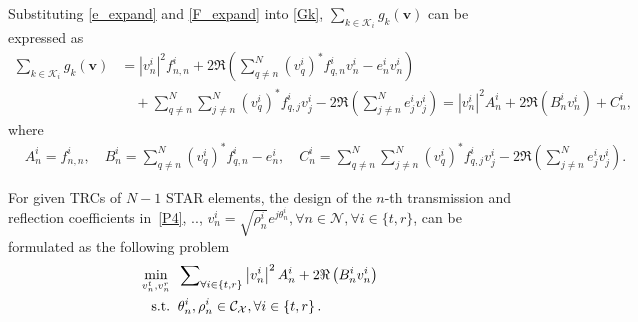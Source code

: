 \documentclass[12pt, draftclsnofoot, onecolumn]{IEEEtran}
\newcommand{\ie}{\text{i}.\text{e}.}
\begin{document}
Substituting \eqref{e_expand} and \eqref{F_expand} into \eqref{Gk}, $\sum_{k\in\mathcal{K}_i}g_k\left(\mathbf{v}\right)$ can be expressed as
\begin{equation}\label{Gk_expand}
\begin{aligned}
\sum_{k\in\mathcal{K}_i}g_k\left(\mathbf{v}\right)&=\left|v_n^{i}\right|^2 f_{n,n}^i+ 2\Re\left(\sum_{q\neq n}^N (v_q^{i})^* f_{q,n}^i v_n^{i}- e_n^iv_n^{i}\right) \\
&\quad+ \sum_{q\neq n}^N\sum_{j\neq n}^N (v_q^{i})^* f_{q,j}^i v_j^{i}-2\Re\left(\sum_{j\neq n}^N e_{j}^iv_j^{i}\right)=\left|v_n^{i}\right|^2A_n^i + 2\Re\left(B_n^iv_n^{i}\right) + C_n^i,
\end{aligned}
\end{equation}
where
\begin{equation}
\begin{aligned}
&A_n^{i}=f_{n,n}^i, \quad B_n^i=\sum_{q\neq n}^N (v_q^{i})^* f_{q,n}^i-e_n^i, \quad C_n^{i}=\sum_{q\neq n}^N\sum_{j\neq n}^N (v_q^{i})^* f_{q,j}^i v_j^{i}-2\Re\left(\sum_{j\neq n}^N e_{j}^iv_j^{i}\right).
\end{aligned}
\end{equation}

For given TRCs of $N-1$ STAR elements, the design of the $n$-th transmission and reflection coefficients in~\eqref{P4}, \ie, $v_n^i=\sqrt{\rho_n^i}e^{j\theta_n^i}, \forall n \in \mathcal{N}, \forall i \in\{t,r\}$, can be formulated as the following problem 
\begin{subequations}\label{P10}
\begin{align}
\mathop {\min }\limits_{ {{v_n^t},{v_n^r}} } \;\;&\sum\nolimits_{ \forall i \in \{t,r\}}\left|v_n^{i}\right|^2A_n^i + 2\Re\left(B_n^iv_n^{i}\right)\\
{\rm{s.t.}}\;\;&{\theta}_n^i, {\rho}_n^i\in \mathcal{C}_{\mathcal{X}},\forall i \in \left\{ {t,r} \right\}.
\end{align}
\end{subequations}
\end{document}
